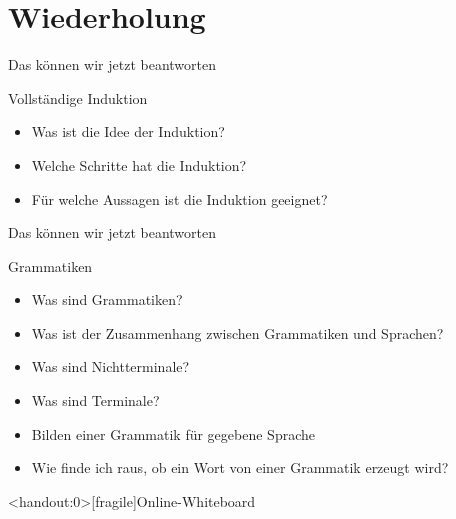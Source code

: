 \section{Wiederholung}
\begin{frame}[fragile]{Das können wir jetzt beantworten}
	\begin{alertblock}{Vollständige Induktion}
		\begin{itemize}
			\item Was ist die Idee der Induktion?
			\item Welche Schritte hat die Induktion? %
			\item Für welche Aussagen ist die Induktion geeignet?
		\end{itemize}
	\end{alertblock}
\end{frame}

\begin{frame}[fragile]{Das können wir jetzt beantworten}
	\begin{alertblock}{Grammatiken}
		\begin{itemize}
        	\item Was sind Grammatiken?
			\item Was ist der Zusammenhang zwischen Grammatiken und Sprachen?
			\item Was sind Nichtterminale?
			\item Was sind Terminale?
			\item Bilden einer Grammatik für gegebene Sprache
        	\item Wie finde ich raus, ob ein Wort von einer Grammatik erzeugt wird?
		\end{itemize}
	\end{alertblock}
\end{frame}




\appendix

\begin{frame}<handout:0>[fragile]{Online-Whiteboard}
	\phantom{text}
\end{frame}


